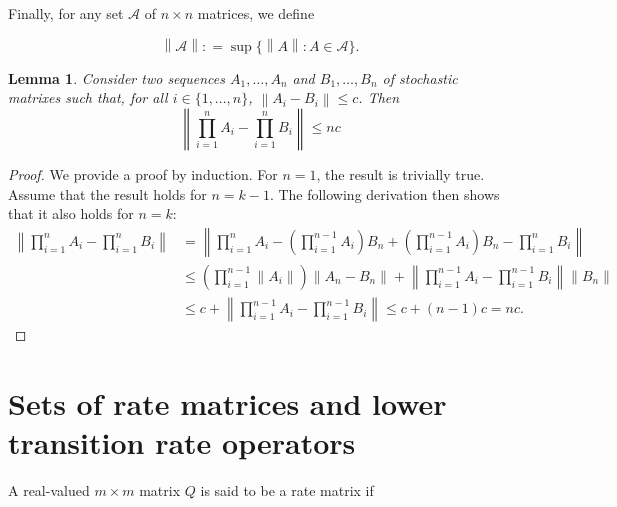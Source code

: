 \documentclass[a4paper,reqno]{amsart}
\newtheorem{lemma}[theorem]{Lemma}
\newcommand{\norm}[1]{\left\lVert #1 \right\rVert}
\newcommand{\coloneqq}{:\!=}
\begin{document}
\noindent
Finally, for any set $\mathcal{A}$ of $n\times n$ matrices, we define

\begin{equation*}
\norm{\mathcal{A}}\coloneqq\sup\{\norm{A}\colon A\in\mathcal{A}\}.
\end{equation*}

\begin{lemma}\label{lemma:differenceproductoftransition}
Consider two sequences $A_1,\dots,A_n$ and $B_1,\dots,B_n$ of stochastic matrixes such that, for all $i\in\{1,\dots,n\}$, $\norm{A_i-B_i}\leq c$. Then
\begin{equation*}
\norm{\prod_{i=1}^nA_i-\prod_{i=1}^nB_i}\leq nc
\end{equation*}
\end{lemma}
\begin{proof}
We provide a proof by induction. For $n=1$, the result is trivially true. Assume that the result holds for $n=k-1$. The following derivation then shows that it also holds for $n=k$: 
\begin{align*}
\norm{\prod_{i=1}^nA_i-\prod_{i=1}^nB_i}
&=
\norm{\prod_{i=1}^{n}A_i-\left(\prod_{i=1}^{n-1}A_i\right)B_n+\left(\prod_{i=1}^{n-1}A_i\right)B_n-\prod_{i=1}^{n}B_i}\\
&\leq
\left(\prod_{i=1}^{n-1}\norm{A_i}\right)\norm{A_n-B_n}+\norm{\prod_{i=1}^{n-1}A_i-\prod_{i=1}^{n-1}B_i}\norm{B_n}\\
&\leq c + \norm{\prod_{i=1}^{n-1}A_i-\prod_{i=1}^{n-1}B_i}\leq c+(n-1)c= nc.
\end{align*}
\end{proof}




\section{Sets of rate matrices and lower transition rate operators}

A real-valued $m\times m$ matrix $Q$ is said to be a rate matrix if
\end{document}

